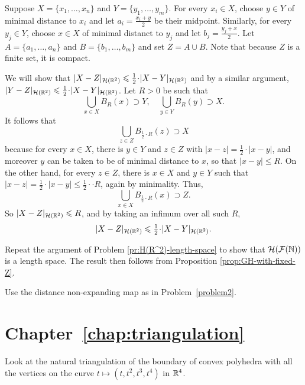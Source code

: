 Suppose $X = \{x_1, \ldots , x_n\}$ and $Y = \{y_1, \ldots , y_m\}$.  
For every $x_i \in X$, choose $y \in Y$ of minimal distance to $x_i$ and let $a_i = \frac{x_i + y}{2}$ be their midpoint.  
Similarly, for every $y_j \in Y$, choose $x \in X$ of minimal distanct to $y_j$ and let $b_j = \frac{y_j + x}{2}$.  Let $A = \{a_1, \ldots , a_n\}$ and $B = \{b_1, \ldots , b_m\}$ and set $Z = A \cup B$.  Note that because $Z$ is a finite set, it is compact.

We will show that $|X - Z|_{\mathcal{H}(\RR^2)} \le \frac{1}{2}\cdot|X - Y|_{\mathcal{H}(\RR^2)}$ and by a similar argument, $|Y - Z|_{\mathcal{H}(\RR^2)} \le \frac{1}{2}\cdot|X - Y|_{\mathcal{H}(\RR^2)}$.  Let $R > 0$ be such that
$$\bigcup_{x \in X}B_R(x) \supset Y, \quad \bigcup_{y \in Y}B_R(y) \supset X.$$
It follows that
$$\bigcup_{z \in Z}B_{\frac{1}{2}\cdot R}(z) \supset X$$
because for every $x \in X$, there is $y \in Y$ and $z \in Z$ with $|x - z| = \frac{1}{2}\cdot|x - y|$, and moreover $y$ can be taken to be of minimal distance to $x$, so that $|x - y| \le R$.  
On the other hand, for every $z \in Z$, there is $x \in X$ and $y \in Y$ 
such that $|x - z| = \frac{1}{2}\cdot|x - y| \le \frac{1}{2}\cdot\cdot R$, again by minimality.  
Thus,
$$\bigcup_{x \in X}B_{\frac{1}{2}\cdot R}(x) \supset Z.$$  
So $|X - Z|_{\mathcal{H}(\mathbb{R}^2)} \leqslant R$, and by taking an infimum over all such $R$,
$$|X - Z|_{\mathcal{H}(\RR^2)} 
\le 
\tfrac{1}{2}\cdot|X - Y|_{\mathcal{H}(\RR^2)}.$$


Repeat the argument of Problem \ref{pr:H(R^2)-length-space} to show that $\mathcal{H}(\mathcal{F}(\mathbb{N}))$ is a length space.  
The result then follows from Proposition \ref{prop:GH-with-fixed-Z}.

Use the distance non-expanding map as in Problem~\ref{problem2}.



\section*{Chapter~\ref{chap:triangulation}}

Look at the natural triangulation of the boundary of convex polyhedra with all the vertices on the curve $t\mapsto(t,t^2,t^3,t^4)$ in $\mathbb{R}^4$.

